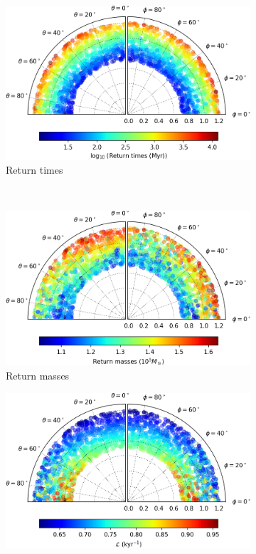 \begin{figure}[h]
    \centering
    \begin{subfigure}[t]{0.4\textwidth}
        \includegraphics[width = \textwidth]{"../Files/Week 13/images/15_time"}
        \caption{Return times}
    \end{subfigure}
    ~ 
    \begin{subfigure}[t]{0.4\textwidth}
        \includegraphics[width=\textwidth]{"../Files/Week 13/images/15_mass"}
        \caption{Return masses}
    \end{subfigure}
    \begin{subfigure}[t]{0.4\textwidth}
        \includegraphics[width=\textwidth]{"../Files/Week 13/images/15_lyapunov"}

\end{subfigure}
\end{figure}
